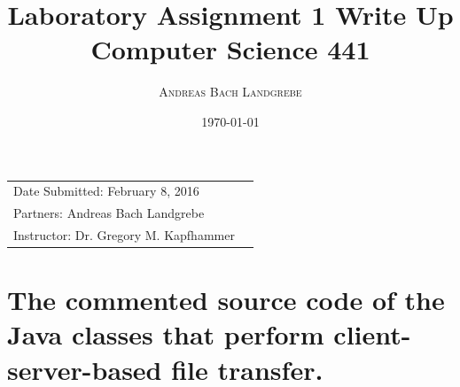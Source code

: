 \documentclass{article}
\title{Laboratory Assignment 1 Write Up \\ Computer Science 441} %
\author{\textsc{Andreas Bach Landgrebe} \\} %
\date{\today} %
\begin{document}
\maketitle %

\begin{center}
\begin{tabular}{l r}
Date Submitted:  February 8, 2016 \\ %
Partners:  Andreas Bach Landgrebe  \\ %
Instructor:  Dr. Gregory M. Kapfhammer  %
\end{tabular}
\end{center}



\section{The commented source code of the Java classes that perform client-server-based file transfer.}
\end{document}
